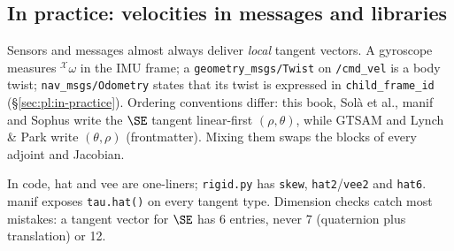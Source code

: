 \subsection{In practice: velocities in messages and libraries}\label{sec:lie:tangent-in-practice}

Sensors and messages almost always deliver \emph{local} tangent vectors. A gyroscope measures ${}^{\mathcal X}\omega$ in the IMU frame; a \texttt{geometry\_msgs/Twist} on \texttt{/cmd\_vel} is a body twist; \texttt{nav\_msgs/Odometry} states that its twist is expressed in \texttt{child\_frame\_id} (\S\ref{sec:pl:in-practice}). Ordering conventions differ: this book, Solà et al., manif and Sophus write the $\SE$ tangent linear-first $(\rho,\theta)$, while GTSAM and Lynch \& Park write $(\theta,\rho)$ (frontmatter). Mixing them swaps the blocks of every adjoint and Jacobian.

In code, hat and vee are one-liners; \texttt{rigid.py} has \texttt{skew}, \texttt{hat2}/\texttt{vee2} and \texttt{hat6}. manif exposes \texttt{tau.hat()} on every tangent type. Dimension checks catch most mistakes: a tangent vector for $\SE$ has 6 entries, never 7 (quaternion plus translation) or 12.
